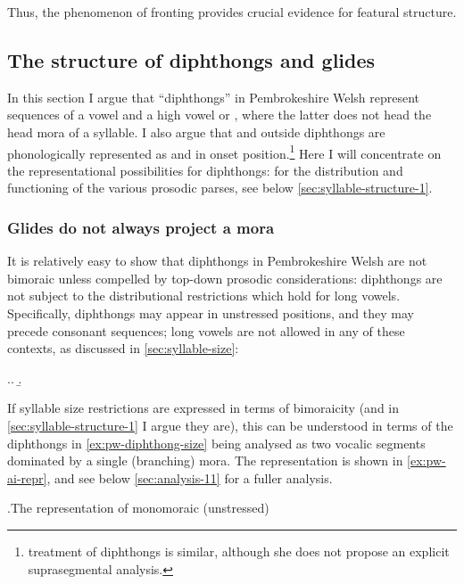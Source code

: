 Thus, the phenomenon of fronting provides crucial evidence for featural structure.

\subsection{The structure of diphthongs and glides}
\label{sec:structure-diphthongs}

In this section I argue that \enquote{diphthongs} in Pembrokeshire Welsh represent sequences of a vowel and a high vowel \ipa{[i]} or \ipa{[u]}, where the latter does not head the head mora of a syllable. I also argue that \ipa{[w]} and \ipa{[j]} outside diphthongs are phonologically represented as \ipa{[u]} and \ipa{[i]} in onset position.\footnote{ treatment of diphthongs is similar, although she does not propose an explicit suprasegmental analysis.} Here I will concentrate on the representational possibilities for diphthongs: for the distribution and functioning of the various prosodic parses, see below \cref{sec:syllable-structure-1}.

\subsubsection{Glides do not always project a mora}
\label{sec:glides-do-not}

It is relatively easy to show that diphthongs in Pembrokeshire Welsh are not bimoraic unless compelled by top-down prosodic considerations: diphthongs are not subject to the distributional restrictions which hold for long vowels. Specifically, diphthongs may appear in unstressed positions, and they may precede consonant sequences; long vowels are not allowed in any of these contexts, as discussed in \cref{sec:syllable-size}:

\ex.\label{ex:pw-diphthong-size}\a.
\b.\label{ex:pw-maint}

If syllable size restrictions are expressed in terms of bimoraicity (and in \cref{sec:syllable-structure-1} I argue they are), this can be understood in terms of the diphthongs in \ref{ex:pw-diphthong-size} being analysed as two vocalic segments dominated by a single (branching) mora. The representation is shown in \ref{ex:pw-ai-repr}, and see below \cref{sec:analysis-11} for a fuller analysis.

\ex.\label{ex:pw-ai-repr}The representation of monomoraic (\ie unstressed) \ipa{[ai]}\\


